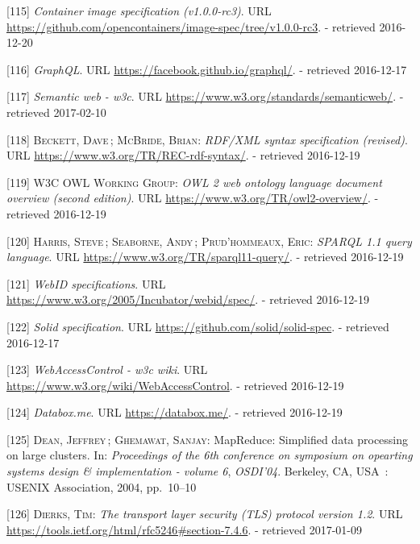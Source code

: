 \documentclass[12pt,english,a4paper,titlepage,cleardoublepage=empty,dottedtoc]{report}
\begin{document}
\hypertarget{ref-web_oci-spec_image}{}
{[}115{]} \emph{Container image specification (v1.0.0-rc3)}. URL
\url{https://github.com/opencontainers/image-spec/tree/v1.0.0-rc3}. -
retrieved 2016-12-20

\hypertarget{ref-web_spec_graphql}{}
{[}116{]} \emph{GraphQL}. URL \url{https://facebook.github.io/graphql/}.
- retrieved 2016-12-17

\hypertarget{ref-web_2016_w3c_semantic-web-activity}{}
{[}117{]} \emph{Semantic web - w3c}. URL
\url{https://www.w3.org/standards/semanticweb/}. - retrieved 2017-02-10

\hypertarget{ref-web_w3c-tr_rdf}{}
{[}118{]} \textsc{Beckett, Dave}\,; \textsc{McBride, Brian}:
\emph{RDF/XML syntax specification (revised)}. URL
\url{https://www.w3.org/TR/REC-rdf-syntax/}. - retrieved 2016-12-19

\hypertarget{ref-web_w3c-tr_owl}{}
{[}119{]} \textsc{W3C OWL Working Group}: \emph{OWL 2 web ontology
language document overview (second edition)}. URL
\url{https://www.w3.org/TR/owl2-overview/}. - retrieved 2016-12-19

\hypertarget{ref-web_w3c-tr_sparql}{}
{[}120{]} \textsc{Harris, Steve}\,; \textsc{Seaborne, Andy}\,;
\textsc{Prud'hommeaux, Eric}: \emph{SPARQL 1.1 query language}. URL
\url{https://www.w3.org/TR/sparql11-query/}. - retrieved 2016-12-19

\hypertarget{ref-web_w3c-draft_webid}{}
{[}121{]} \emph{WebID specifications}. URL
\url{https://www.w3.org/2005/Incubator/webid/spec/}. - retrieved
2016-12-19

\hypertarget{ref-web_spec_solid}{}
{[}122{]} \emph{Solid specification}. URL
\url{https://github.com/solid/solid-spec}. - retrieved 2016-12-17

\hypertarget{ref-web_2016_wiki_webaccesscontrol}{}
{[}123{]} \emph{WebAccessControl - w3c wiki}. URL
\url{https://www.w3.org/wiki/WebAccessControl}. - retrieved 2016-12-19

\hypertarget{ref-web_2016_demo_databox}{}
{[}124{]} \emph{Databox.me}. URL \url{https://databox.me/}. - retrieved
2016-12-19

\hypertarget{ref-paper_2004_distributed-mapreduce}{}
{[}125{]} \textsc{Dean, Jeffrey}\,; \textsc{Ghemawat, Sanjay}:
MapReduce: Simplified data processing on large clusters. In:
\emph{Proceedings of the 6th conference on symposium on opearting
systems design \& implementation - volume 6}, \emph{OSDI'04}. Berkeley,
CA, USA~: USENIX Association, 2004, pp.~10--10

\hypertarget{ref-web_spec_tls-12_client-auth}{}
{[}126{]} \textsc{Dierks, Tim}: \emph{The transport layer security (TLS)
protocol version 1.2}. URL
\url{https://tools.ietf.org/html/rfc5246\#section-7.4.6}. - retrieved
2017-01-09
\end{document}
